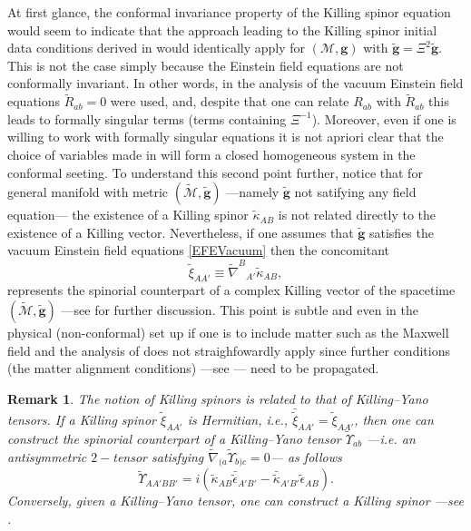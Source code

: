 \documentclass[10pt,a4paper]{article}
\theoremstyle{plain}
\newtheorem{remark}{Remark}
\def\bmg{{\bm g}}
\begin{document}
{\medskip

At first glance, the conformal invariance property of the
Killing spinor equation would seem to indicate that the
approach leading to the Killing spinor initial data conditions derived
in \cite{GarVal08c} would identically apply for $(\mathcal{M},\bmg)$
with $\tilde\bmg=\Xi^2\tilde{\bmg}$. This is not the case simply
because the Einstein field equations are not conformally invariant.
In other words, in the analysis of \cite{GarVal08c} the vacuum
Einstein field equations $\tilde{R}_{ab}=0$ were used, and, despite
that one can relate $R_{ab}$ with $\tilde{R}_{ab}$ this leads to
formally singular terms (terms containing $\Xi^{-1}$). Moreover, even if one
is willing to work with formally singular equations it is not apriori clear
that the choice of variables made in \cite{GarVal08c} will form a
closed homogeneous system in the conformal seeting.  To understand
this second point further, notice that for general manifold with
metric $(\tilde{\mathcal{M}},\tilde{\bmg})$ ---namely $\tilde{\bmg}$
not satifying any field equation--- the existence of a Killing spinor
$\tilde{\kappa}_{AB}$ is not related directly to the existence of a
Killing vector.
Nevertheless, if one assumes that $\tilde{\bmg}$
satisfies the vacuum Einstein field equations \eqref{EFEVacuum} then
the concomitant
\begin{equation*}
\tilde{\xi}_{AA'} \equiv \tilde{\nabla}^{B}{}_{A'}\tilde{\kappa}_{AB},
\end{equation*}
represents the spinorial counterpart of a complex Killing vector of
the spacetime $(\tilde{\mathcal{M}},\tilde{\bmg})$ ---see
\cite{GarVal08c} for further discussion. This point is subtle and even
in the physical (non-conformal) set up if one is to include matter
such as the Maxwell field and the analysis of \cite{GarVal08c} does
not straighfowardly apply since further conditions (the matter
alignment conditions) ---see \cite{ValCol16}--- need to be propagated.
}


\begin{remark}
  \emph{
  The notion of Killing spinors is related to that
  of Killing--Yano tensors. If a Killing spinor
$\tilde{\xi}_{AA'}$ is Hermitian, i.e.,
$\bar{\tilde{\xi}}_{AA'}=\tilde{\xi}_{AA'}$, then one can construct the
spinorial counterpart of a \emph{Killing--Yano tensor}
$\tilde{\Upsilon}_{ab}$ ---i.e. an antisymmetric $2-$tensor satisfying
$\tilde{\nabla}_{(a}\tilde{\Upsilon}_{b)c}=0$--- as follows
\[\tilde{\Upsilon}_{AA'BB'}=i(\tilde{\kappa}_{AB}\bar{\tilde{\epsilon}}_{A'B'}
-\bar{\tilde{\kappa}}_{A'B'}\tilde{\epsilon}_{AB}).\] Conversely,
given a Killing--Yano tensor, one can construct a Killing spinor
---see \cite{ColVal16,McLBer93,PenRin86}.}
\end{remark}
\end{document}
